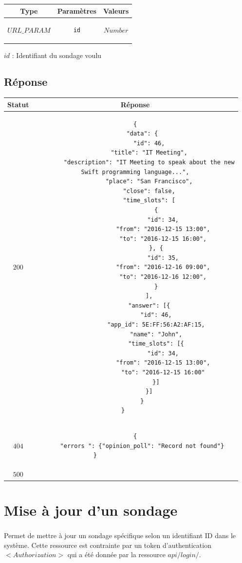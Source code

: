 \documentclass[titlepage]{report}
\begin{document}
\begin{center}
\begin{tabular}{|c|c|c|}
	\hline
	Type & Paramètres & Valeurs 
	\\ \hline
	$ URL\_PARAM $ & 	
	\begin{lstlisting}
id
	\end{lstlisting} &
	$ Number $
	\\ \hline
\end{tabular}
\end{center}

\par $ id $ : Identifiant du sondage voulu

\section{Réponse}

\begin{center}
		\begin{tabular}{|c|c|}
			\hline
			Statut & Réponse \\
			\hline
			$ 200 $ & \begin{lstlisting}
{
	"data": {
		"id": 46,
		"title": "IT Meeting",
		"description": "IT Meeting to speak about the new
Swift programming language...",
		"place": "San Francisco",
		"close": false,
		"time_slots": [
			{
				"id": 34,
				"from": "2016-12-15 13:00",
				"to": "2016-12-15 16:00",
			}, {
				"id": 35,
				"from": "2016-12-16 09:00",
				"to": "2016-12-16 12:00",
			}
		],
		"answer": [{
			"id": 46,
			"app_id": 5E:FF:56:A2:AF:15,
			"name": "John",
			"time_slots": [{
				"id": 34,
				"from": "2016-12-15 13:00",
				"to": "2016-12-15 16:00"
			}]
		}]
	}
}		
			\end{lstlisting} \\ 
			\hline
			$ 404 $ &\begin{lstlisting}
{
	"errors ": {"opinion_poll": "Record not found"}
}						
			\end{lstlisting}
			 \\
			\hline
			$ 500 $ & \\
			\hline
		\end{tabular}
\end{center}


\chapter{Mise à jour d'un sondage}

\paragraph{} Permet de mettre à jour un sondage spécifique selon un identifiant ID dans le système. Cette ressource est contrainte par un token d'authentication $<Authorization>$ qui a été donnée par la ressource $api/login/$.
\end{document}
